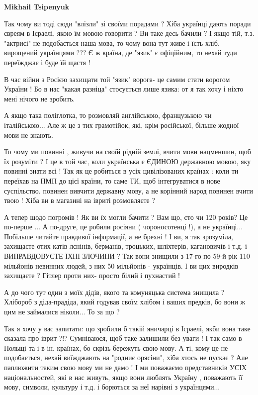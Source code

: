 \begin{itemize}
\begin{itemize}
\begin{itemize}
 
\textbf{Mikhail Tsipenyuk} 

Так чому ви тоді сюди "влізли" зі своїми порадами ?  Хіба українці дають поради
євреям в Ісраелі, якою їм мовою говорити ? Ви таке десь бачили ? І якщо тій,
т.з. "актрисі" не подобається наша мова, то чому вона тут живе і їсть хліб,
вирощений українцями ??? Є ж країна, де "язик" є офіційним, то нехай туди
переїжджає і буде їй щастя ! 

В час війни з Росією захищати той "язик" ворога- це самим стати ворогом України
! Бо в нас "какая разніца" стосується лише язика: от я так хочу і ніхто мені
нічого не зробить. 

А якщо така поліглотка, то розмовляй англійською, французькою чи італійською...
Але ж це з тих грамотійок, які, крім російської, більше жодної мови не знають.

То чому ми повинні , живучи на своїй рідній землі, вчити мови нацменшин, щоб їх
розуміти ? І це в той час, коли українська є ЄДИНОЮ державною мовою, яку
повинні знати всі ! Так як це робиться в усіх цивілізованих країнах : коли ти
переїхав на ПМП до цієї країни, то саме ТИ, щоб інтегруватися в нове
суспільство. повинен вивчити державну мову, а не корінний народ повинен вчити
твою ! Хіба ви в магазині на івриті розмовляєте ? 

А тепер щодо погромів ! Як ви їх могли бачити ? Вам що, сто чи 120 років? Це
по-перше ... А по-друге, це робили росіяни ( чороносотенці !), а не українці...
Побільше читайте правдивої інформації, а не брехні ! І ви, я так зрозуміла,
захищаєте отих катів лєнінів, берманів, троцьких, шліхтерів, кагановичів і т.д.
і ВИПРАВДОВУЄТЕ ЇХНІ ЗЛОЧИНИ ? Так вони знищили з 17-го по 59-й рік 110
мільйонів невинних людей, з них 50 мільйонів - українців. І ви цих виродків
захищаєте ? Гітлер проти них- просто білий і пухнастий ! 

А до чого тут один з моїх дідів, якого та комуняцька система знищила ? Хлібороб
з діда-прадіда, який годував своїм хлібом і ваших предків, бо вони ж цим не
займалися ніколи... То за що ? 

Так я хочу у вас запитати: що зробили б такій яничарці в Ісраелі, якби вона
таке сказала про іврит ?!? Сумніваюся, щоб таке залишили без уваги ! І так само
в Польщі та і в ін. країнах, бо скрізь бережуть свою мову. А ті, кому це не
подобається, нехай виїжджають на "родниє орясіни", хіба хтось не пускає ? Але
паплюжити таким свою мову ми не дамо ! І ми поважаємо представників УСІХ
національностей, які в нас живуть, якщо вони люблять Україну , поважають її
мову, символи, культуру і т.д.  і борються за неї нарівні з українцями... 


\end{itemize}
\end{itemize}
\end{itemize}
